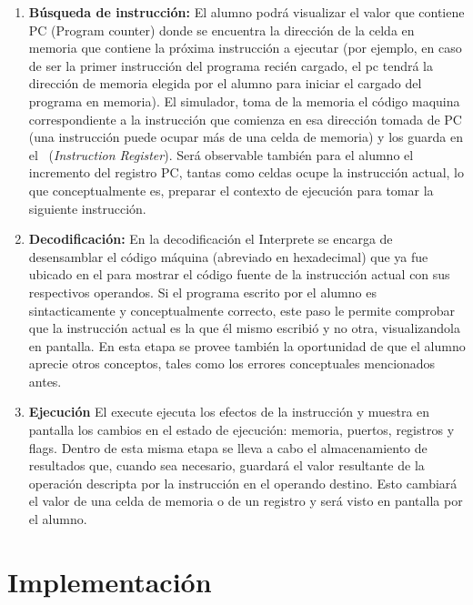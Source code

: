 \begin{enumerate}
\item \textbf{Búsqueda de instrucción:} El alumno podrá visualizar el valor que contiene PC (Program counter) donde se encuentra la dirección de la celda en memoria que contiene la próxima instrucción a ejecutar (por ejemplo, en caso de ser la primer instrucción del programa recién cargado, el pc tendrá la dirección de memoria elegida por el alumno para iniciar el cargado del programa en memoria). El simulador, toma de la memoria el código maquina correspondiente a la instrucción que comienza en esa dirección tomada de PC (una instrucción puede ocupar más de una celda de memoria) y los guarda en el \IR\ (\textit{Instruction Register}). Será observable también para el alumno el incremento del registro PC, tantas como celdas ocupe la instrucción actual, lo que conceptualmente es, preparar el contexto de ejecución para tomar la siguiente instrucción.

\item  \textbf{Decodificación:}
En la decodificación el Interprete se encarga de desensamblar el código máquina (abreviado en hexadecimal) que ya fue ubicado en el \IR para mostrar el código fuente de la instrucción actual con sus respectivos operandos. Si el programa escrito por el alumno es sintacticamente y conceptualmente correcto, este paso le permite comprobar que la instrucción actual es la que él mismo escribió y no otra, visualizandola en pantalla. En esta etapa se provee también la oportunidad de que el alumno aprecie otros conceptos, tales como los errores conceptuales mencionados antes.

\item  \textbf{Ejecución}
El execute ejecuta los efectos de la instrucción y muestra en pantalla los cambios en el estado de ejecución: memoria, puertos, registros y flags. Dentro de esta misma etapa se lleva a cabo el almacenamiento de resultados que, cuando sea necesario, guardará el valor resultante de la operación descripta por la instrucción en el operando destino. Esto cambiará el valor de una celda de memoria o de un registro y será visto en pantalla por el alumno.
\end{enumerate}


\section{Implementación}

